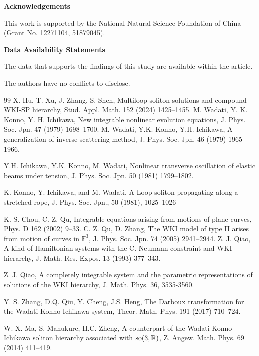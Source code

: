 \documentclass[11pt]{article}
\numberwithin{equation}{section}
\begin{document}
\noindent\textbf{Acknowledgements}

	This work is supported by  the National Natural Science
	Foundation of China (Grant No. 12271104,  51879045).\vspace{2mm}
	
	\noindent\textbf{Data Availability Statements}
	
	The data that supports the findings of this study are available within the article.\vspace{2mm}
	
	
	The authors have no conflicts to disclose.		

\begin{thebibliography}{99}
 X. Hu, T. Xu, J. Zhang, S. Shen, Multiloop soliton solutions and compound WKI-SP hierarchy, Stud. Appl. Math. 152 (2024) 1425--1455.
 M. Wadati, Y. K. Konno, Y. H. Ichikawa, New integrable nonlinear evolution equations, J. Phys. Soc. Jpn. 47 (1979) 1698--1700.
 M. Wadati, Y.K. Konno, Y.H. Ichikawa, A generalization of inverse scattering method, J. Phys. Soc. Jpn. 46 (1979) 1965--1966.

 Y.H. Ichikawa, Y.K. Konno, M. Wadati, Nonlinear transverse oscillation of elastic beams under tension, J. Phys. Soc. Jpn. 50 (1981) 1799--1802.

  K. Konno, Y. Ichikawa, and M. Wadati, A Loop soliton propagating along a stretched rope, J. Phys. Soc. Jpn., 50 (1981), 1025--1026

 K. S. Chou, C. Z. Qu, Integrable equations arising from motions of plane curves, Phys. D 162 (2002) 9--33.
 C. Z. Qu, D. Zhang, The WKI model of type II arises from motion of curves in \(\mathbb{E}^3\), J. Phys. Soc. Jpn. 74 (2005) 2941--2944.
 Z. J. Qiao, A kind of Hamiltonian systems with the C. Neumann constraint and WKI hierarchy, J. Math. Res. Expos. 13 (1993) 377--343.

 Z. J. Qiao,  A completely integrable system and the parametric representations of solutions of the WKI hierarchy, J.  Math. Phys. 36, 3535-3560.

 Y. S. Zhang, D.Q. Qiu, Y. Cheng, J.S. Heng, The Darboux transformation for the Wadati-Konno-Ichikawa system, Theor. Math. Phys. 191 (2017) 710--724.

 W. X. Ma, S. Manukure, H.C. Zheng, A counterpart of the Wadati-Konno-Ichikawa soliton hierarchy associated with $\textup{so}(3, \mathbb{R})$, Z. Angew. Math. Phys. 69 (2014) 411--419.


\end{thebibliography}
\end{document}
